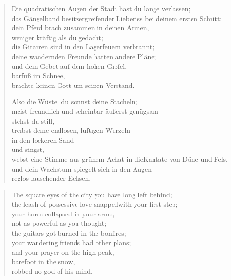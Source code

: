 
{\setlength{\vleftmargin}{1em}

\cleartoverso


\begin{verse}

Die quadratischen Augen der Stadt hast du lange verlassen;\\
das Gängelband besitzergreifender Liebe\verselinebreak riss bei deinem ersten Schritt;\\
dein Pferd brach zusammen in deinen Armen,\\
weniger kräftig als du gedacht;\\
die Gitarren sind in den Lagerfeuern verbrannt;\\
deine wandernden Freunde hatten andere Pläne;\\
und dein Gebet auf dem hohen Gipfel,\\
barfuß im Schnee,\\
brachte keinen Gott um seinen Verstand.

Also die Wüste: du sonnst deine Stacheln;\\
meist freundlich und scheinbar äußerst genügsam\\
stehst du still,\\
treibst deine endlosen, luftigen Wurzeln\\
in den lockeren Sand\\
und singst,\\
webst eine Stimme aus grünem Achat in die\verselinebreak Kantate von Düne und Fels,\\
und dein Wachstum spiegelt sich in den Augen\\
reglos lauschender Echsen.

\end{verse}

\clearpage


\begin{verse}

The square eyes of the city you have long left behind;\\
the leash of possessive love snapped\verselinebreak with your first step;\\
your horse collapsed in your arms,\\
not as powerful as you thought;\\
the guitars got burned in the bonfires;\\
your wandering friends had other plans;\\
and your prayer on the high peak,\\
barefoot in the snow,\\
robbed no god of his mind.


\end{verse}}
